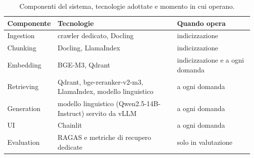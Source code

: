 \begin{table}[H]
  \centering
  \footnotesize
  \begin{tabularx}{\textwidth}{@{} L{2.2cm} >{\raggedright\arraybackslash}X L{3.4cm} @{}}
    \toprule
    \textbf{Componente} & \textbf{Tecnologie} & \textbf{Quando opera} \\
    \midrule
    Ingestion & crawler dedicato, Docling & indicizzazione \\
    Chunking & Docling, LlamaIndex & indicizzazione \\
    Embedding & BGE-M3, Qdrant & indicizzazione e a ogni domanda \\
    Retrieving & Qdrant, bge-reranker-v2-m3, LlamaIndex, modello linguistico & a ogni domanda \\
    Generation & modello linguistico (Qwen2.5-14B-Instruct) servito da vLLM & a ogni domanda \\
    UI & Chainlit & a ogni domanda \\
    Evaluation & RAGAS e metriche di recupero dedicate & solo in valutazione \\
    \bottomrule
  \end{tabularx}
  \caption{Componenti del sistema, tecnologie adottate e momento in cui operano.}
  \label{tab:componenti}
\end{table}
